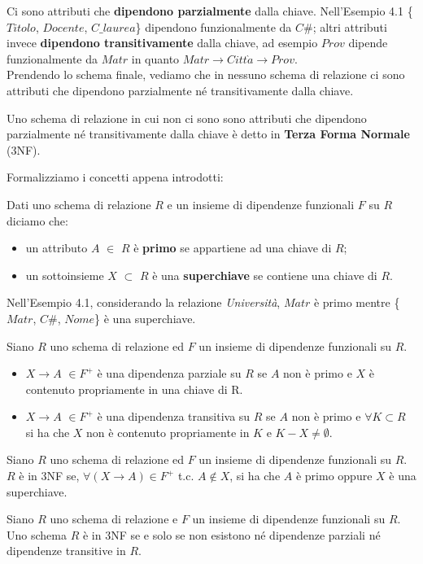 Ci sono attributi che \textbf{dipendono parzialmente} dalla chiave. Nell'Esempio 4.1 
\{$Titolo$, $Docente$, $C\_laurea$\} dipendono funzionalmente da $C\#$; altri attributi
invece \textbf{dipendono transitivamente} dalla chiave, ad esempio $Prov$ dipende
funzionalmente da $Matr$ in quanto $Matr \rightarrow Citt\grave{a} \rightarrow Prov$.\\
Prendendo lo schema finale, vediamo che in nessuno schema di relazione ci sono attributi
che dipendono parzialmente né transitivamente dalla chiave. 
\begin{prop}
Uno schema di relazione in cui non ci sono sono attributi che dipendono parzialmente né 
transitivamente dalla chiave è detto in \textbf{Terza Forma Normale} (3NF). 
\end{prop}
Formalizziamo i concetti appena introdotti:
\begin{defn}
 Dati uno schema di relazione $R$ e un insieme di dipendenze funzionali $F$ su $R$
diciamo che:
\begin{itemize}
 \item un attributo $A$ $\in$ $R$ è \textbf{primo} se appartiene ad una chiave di $R$;
 \item un sottoinsieme $X$ $\subset$ $R$ è una \textbf{superchiave} se contiene una 
 chiave di $R$.
\end{itemize}
\end{defn}
Nell'Esempio 4.1, considerando la relazione \emph{Università}, $Matr$ è primo mentre
 \{$Matr$, $C\#$, $Nome$\} è una superchiave.
\begin{defn}
Siano $R$ uno schema di relazione ed $F$ un insieme di dipendenze funzionali su $R$.
\begin{itemize}
 \item $X\rightarrow A$ $\in F^+$ è una dipendenza parziale su $R$ se $A$ non 
 è primo e $X$ è contenuto propriamente in una chiave di R.
 \item $X\rightarrow A$ $\in F^+$ è una dipendenza transitiva su $R$ se $A$ 
 non è primo e $\forall K \subset R$ si ha che $X$ non è contenuto propriamente 
 in $K$ e $K-X \neq \emptyset$.
\end{itemize}
\end{defn}
\begin{prop}
Siano $R$ uno schema di relazione ed $F$ un insieme di dipendenze funzionali su $R$. 
$R$ è in 3NF se, $\forall (X\rightarrow A) \in F^+$ t.c. $A\notin X$, si ha che $A$ è
primo oppure $X$ è una superchiave.
\end{prop}
\begin{theo}
Siano $R$ uno schema di relazione e $F$ un insieme di dipendenze funzionali su $R$. Uno
schema $R$ è in 3NF se e solo se non esistono né dipendenze parziali né dipendenze 
transitive in $R$.
\end{theo}
